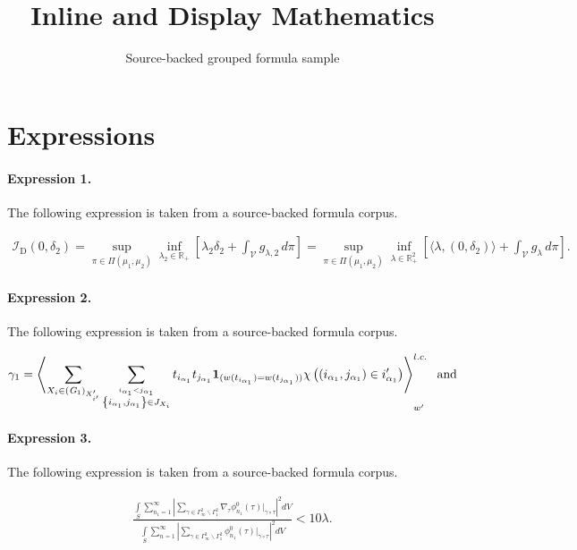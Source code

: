 \documentclass[11pt]{article}
\title{Inline and Display Mathematics}
\author{Source-backed grouped formula sample}
\date{}
\begin{document}
\maketitle
\section{Expressions}
\paragraph{Expression 1.} The following expression is taken from a source-backed formula corpus.

\begin{align*}\mathcal{I}_{\mathrm{D}}\left(0, \delta_2\right)=\sup _{\pi \in \Pi\left(\mu_1, \mu_2\right)} \inf _{\lambda_2 \in \mathbb{R}_{+}}\left[\lambda_2 \delta_2+\int_{\mathcal{V}} g_{\lambda, 2} \, d \pi\right]= \sup_{\pi \in \Pi(\mu_1, \mu_2) } \inf _{\lambda \in \mathbb{R}^2_{+} }\left[ \langle \lambda , \left( 0, \delta_2 \right) \rangle + \int_{\mathcal{V}} g_{\lambda} \, d \pi\right] .\end{align*}

\paragraph{Expression 2.} The following expression is taken from a source-backed formula corpus.

\begin{align*}\gamma_{1}=\left\langle\sum_{X_i\in ({\it G}_1)_{X'_{i'}}}\sum_{\stackrel{i_{\alpha_{1}}< j_{\alpha_{1}}}{\left\{i_{\alpha_{1}},j_{\alpha_{1}}\right\}\in J_{X_{i}}}}t_{i_{\alpha_{1}}}t_{j_{\alpha_{1}}}{\bf 1}_{(w(t_{i_{\alpha_{1}}})=w(t_{j_{\alpha_{1}}}))}\chi\left(\left(i_{\alpha_{1}},j_{\alpha_{1}}\right)\in i'_{\alpha_{1}}\right)\right\rangle ^{l.c.}_{w'}\;\text{ and}\end{align*}

\paragraph{Expression 3.} The following expression is taken from a source-backed formula corpus.

\begin{align*}\frac{\int\limits_{S}\sum\limits^\infty_{n_{1}=1}\left|\sum\limits_{\gamma\in\Gamma^{2}_{\infty}\backslash\Gamma^{2}_{1}}\nabla_{\tau}\phi^0_{n_{1}}(\tau)\big|_{\gamma\circ\tau}\right|^2 dV}{\int\limits_S\sum\limits^\infty_{n=1}\left|\sum\limits_{\gamma\in\Gamma^{2}_{\infty}\backslash\Gamma^{2}_{1}}\phi^0_{n_{1}}(\tau)\big|_{\gamma\circ\tau}\right|^2 dV} < 10 \lambda.\end{align*}
\end{document}
